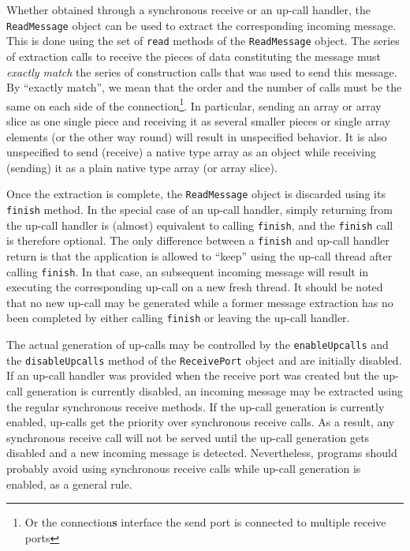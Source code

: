 \documentclass[11pt]{book}
\begin{document}
Whether obtained through a synchronous receive or an up-call handler,
the \texttt{ReadMessage} object can be used to extract the
corresponding incoming message. This is done using the set of
\texttt{read} methods of the \texttt{ReadMessage} object. The series
of extraction calls to receive the pieces of data constituting the
message must \emph{exactly match} the series of construction calls
that was used to send this message. By ``exactly match'', we mean that
the order and the number of calls must be the same on each side of the
connection\footnote{Or the connection\textbf{s} interface the send
  port is connected to multiple receive ports}. In particular, sending
an array or array slice as one single piece and receiving it as
several smaller pieces or single array elements (or the other way
round) will result in unspecified behavior. It is also unspecified to
send (receive) a native type array as an object while receiving
(sending) it as a plain native type array (or array slice).

Once the extraction is complete, the \texttt{ReadMessage} object is
discarded using its \texttt{finish} method. In the special case of an
up-call handler, simply returning from the up-call handler is (almost) equivalent
to calling \texttt{finish}, and the \texttt{finish} call is therefore
optional. The only difference between a \texttt{finish} and up-call
handler return is that the application is allowed to ``keep'' using
the up-call thread after calling \texttt{finish}. In that case, an
subsequent incoming message will result in executing the corresponding
up-call on a new fresh thread. It should be noted that no new up-call
may be generated while a former message extraction has no been
completed by either calling \texttt{finish} or leaving the up-call
handler.

The actual generation of up-calls may be controlled by the
\texttt{enableUpcalls} and the \texttt{disableUpcalls} method of the
\texttt{ReceivePort} object and are initially disabled. If an up-call
handler was provided when the receive port was created but the up-call
generation is currently disabled, an incoming message may be extracted
using the regular synchronous receive methods. If the up-call
generation is currently enabled, up-calls get the priority over
synchronous receive calls. As a result, any synchronous receive call
will not be served until the up-call generation gets disabled and a new
incoming message is detected. Nevertheless, programs should probably
avoid using synchronous receive calls while up-call generation is
enabled, as a general rule.
\end{document}
